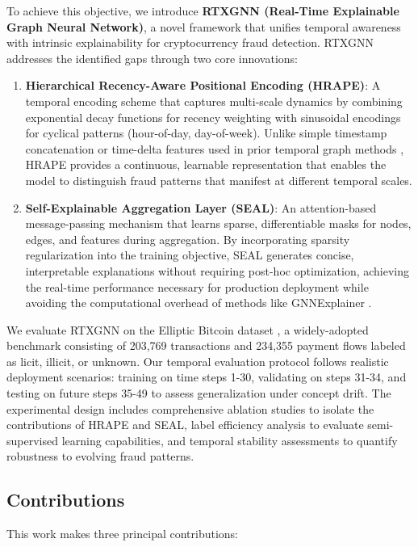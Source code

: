 To achieve this objective, we introduce \textbf{RTXGNN (Real-Time Explainable Graph Neural Network)}, a novel framework that unifies temporal awareness with intrinsic explainability for cryptocurrency fraud detection. RTXGNN addresses the identified gaps through two core innovations:

\begin{enumerate}
    \item \textbf{Hierarchical Recency-Aware Positional Encoding (HRAPE)}: A temporal encoding scheme that captures multi-scale dynamics by combining exponential decay functions for recency weighting with sinusoidal encodings for cyclical patterns (hour-of-day, day-of-week). Unlike simple timestamp concatenation or time-delta features used in prior temporal graph methods \citep{sankar2020dysat}, HRAPE provides a continuous, learnable representation that enables the model to distinguish fraud patterns that manifest at different temporal scales.
    
    \item \textbf{Self-Explainable Aggregation Layer (SEAL)}: An attention-based message-passing mechanism that learns sparse, differentiable masks for nodes, edges, and features during aggregation. By incorporating sparsity regularization into the training objective, SEAL generates concise, interpretable explanations without requiring post-hoc optimization, achieving the real-time performance necessary for production deployment while avoiding the computational overhead of methods like GNNExplainer \citep{ying2019gnnexplainer}.
\end{enumerate}

We evaluate RTXGNN on the Elliptic Bitcoin dataset \citep{weber2019anti}, a widely-adopted benchmark consisting of 203,769 transactions and 234,355 payment flows labeled as licit, illicit, or unknown. Our temporal evaluation protocol follows realistic deployment scenarios: training on time steps 1-30, validating on steps 31-34, and testing on future steps 35-49 to assess generalization under concept drift. The experimental design includes comprehensive ablation studies to isolate the contributions of HRAPE and SEAL, label efficiency analysis to evaluate semi-supervised learning capabilities, and temporal stability assessments to quantify robustness to evolving fraud patterns.

\subsection*{Contributions}
This work makes three principal contributions:

